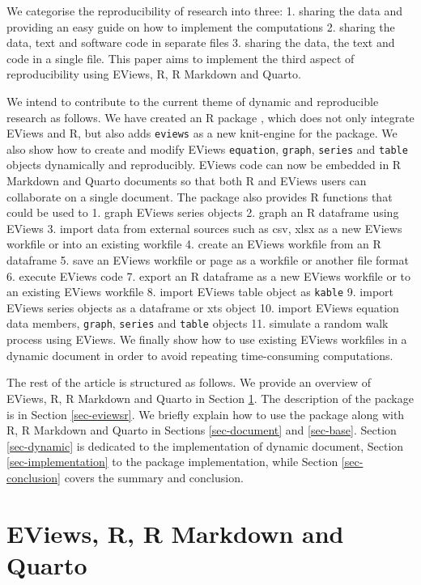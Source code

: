 We categorise the reproducibility of research into three: 1. sharing the data and providing an easy guide on how to implement the computations 2. sharing the data, text and software code in separate files 3. sharing the data, the text and code in a single file. This paper aims to implement the third aspect of reproducibility using EViews, R, R Markdown and Quarto.

We intend to contribute to the current theme of dynamic and reproducible research as follows. We have created an R package , which does not only integrate EViews and R, but also adds \texttt{eviews} as a new knit-engine for the  package. We also show how to create and modify EViews \texttt{equation}, \texttt{graph}, \texttt{series} and \texttt{table} objects dynamically and reproducibly. EViews code can now be embedded in R Markdown and Quarto documents so that both R and EViews users can collaborate on a single document. The package also provides R functions that could be used to 1. graph EViews series objects 2. graph an R dataframe using EViews 3. import data from external sources such as csv, xlsx as a new EViews workfile or into an existing workfile 4. create an EViews workfile from an R dataframe 5. save an EViews workfile or page as a workfile or another file format 6. execute EViews code 7. export an R dataframe as a new EViews workfile or to an existing EViews workfile 8. import EViews table object as \texttt{kable} 9. import EViews series objects as a dataframe or xts object 10. import EViews equation data members, \texttt{graph}, \texttt{series} and \texttt{table} objects 11. simulate a random walk process using EViews. We finally show how to use existing EViews workfiles in a dynamic document in order to avoid repeating time-consuming computations.

The rest of the article is structured as follows. We provide an overview of EViews, R, R Markdown and Quarto in Section \ref{sec-tools}. The description of the  package is in Section \ref{sec-eviewsr}. We briefly explain how to use the package along with R, R Markdown and Quarto in Sections \ref{sec-document} and \ref{sec-base}. Section \ref{sec-dynamic} is dedicated to the implementation of dynamic document, Section \ref{sec-implementation} to the package implementation, while Section \ref{sec-conclusion} covers the summary and conclusion.

\hypertarget{sec-tools}{%
\section{EViews, R, R Markdown and Quarto}\label{sec-tools}}

